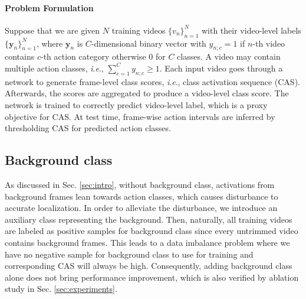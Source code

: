 \documentclass[letterpaper]{article} %
\newcommand{\ie}{\textit{i}.\textit{e}.}
\newcommand{\Sref}[1]{Sec. \ref{#1}}
\begin{document}
\paragraph{Problem Formulation}
Suppose that we are given $N$ training videos $\{v_{n}\}^{N}_{n=1}$ with their video-level labels $\{\mathbf{y}_{n}\}^{N}_{n=1}$, where $\mathbf{y}_{n}$ is $C$-dimensional binary vector with $y_{n;c}=1$ if $n$-th video contains $c$-th action category otherwise $0$ for $C$ classes. A video may contain multiple action classes, \ie, $\sum_{c=1}^{C}{y_{n;c}}\geq1$. Each input video goes through a network to generate frame-level class scores, \ie, class activation sequence (CAS). Afterwards, the scores are aggregated to produce a video-level class score. The network is trained to correctly predict video-level label, which is a proxy objective for CAS.
At test time, frame-wise action intervals are inferred by thresholding CAS for predicted action classes.

\subsection{Background class}
As discussed in \Sref{sec:intro}, without background class, activations from background frames lean towards action classes, which causes disturbance to accurate localization. In order to alleviate the disturbance, we introduce an auxiliary class representing the background. Then, naturally, all training videos are labeled as positive samples for background class since every untrimmed video contains background frames. This leads to a data imbalance problem where we have no negative sample for background class to use for training and corresponding CAS will always be high. Consequently, adding background class alone does not bring performance improvement, which is also verified by ablation study in \Sref{sec:experiments}.
\end{document}
